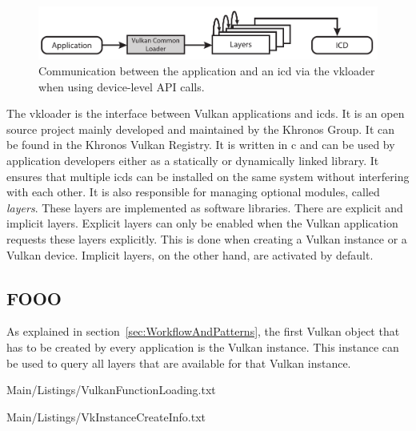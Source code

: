     \begin{figure}
      \includegraphics{Main/Images/VulkanLoaderDeviceLayers}
      \centering
      \caption{Communication between the application and an \gls{icd} via the \gls{vkloader} when using device-level API calls.}
      \label{fig:VulkanLoaderWithDeviceLayers}
    \end{figure}

    The \gls{vkloader} is the interface between Vulkan applications and \glspl{icd}. It is an open source project mainly developed and maintained by the Khronos Group. It can be found in the Khronos Vulkan Registry\cite{vulkanregistry}. It is written in \gls{c} and can be used by application developers either as a statically or dynamically linked library. It ensures that multiple \glspl{icd} can be installed on the same system without interfering with each other. It is also responsible for managing optional modules, called \textit{layers}. These layers are implemented as software libraries. There are explicit and implicit layers. Explicit layers can only be enabled when the Vulkan application requests these layers explicitly. This is done when creating a Vulkan instance or a Vulkan device. Implicit layers, on the other hand, are activated by default.

    \subsection{FOOO}

    As explained in section~\ref{sec:WorkflowAndPatterns}, the first Vulkan object that has to be created by every application is the Vulkan instance. This instance can be used to query all layers that are available for that Vulkan instance.

    
    {Main/Listings/VulkanFunctionLoading.txt}

    
    {Main/Listings/VkInstanceCreateInfo.txt}

